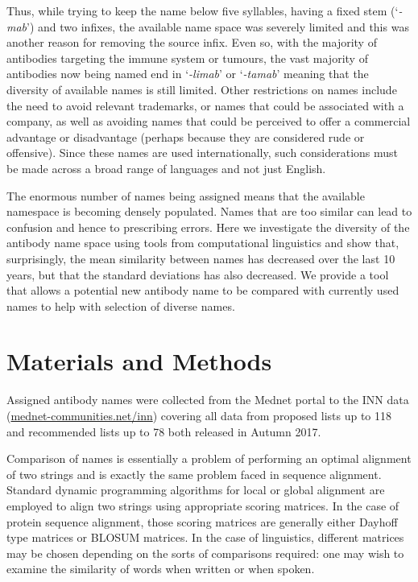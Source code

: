 \documentclass{article}
\newcommand{\eg}[1]{\mbox{`\emph{#1}'}}
\begin{document}
Thus, while trying to keep the name below five syllables, having a
fixed stem (\eg{-mab}) and two infixes, the available name space was
severely limited and this was another reason for removing the source
infix. Even so, with the majority of antibodies targeting the immune
system or tumours, the vast majority of antibodies now being named end
in \eg{-limab} or \eg{-tamab} meaning that the diversity of available
names is still limited. Other restrictions on names include the need
to avoid relevant trademarks, or names that could be associated with a
company, as well as avoiding names that could be perceived to offer a
commercial advantage or disadvantage (perhaps because they are
considered rude or offensive). Since these names are used
internationally, such considerations must be made across a broad range
of languages and not just English.

The enormous number of names being assigned means that the available
namespace is becoming densely populated. Names that are too similar
can lead to confusion and hence to prescribing errors. Here we
investigate the diversity of the antibody name space using tools from
computational linguistics and show that, surprisingly, the mean
similarity between names has decreased over the last 10 years, but
that the standard deviations has also decreased.  We provide a tool
that allows a potential new antibody name to be compared with
currently used names to help with selection of diverse names.

\section{Materials and Methods}
Assigned antibody names were collected from the Mednet portal to the
INN data (\url{mednet-communities.net/inn}) covering all data from
proposed lists up to 118 and recommended lists up to 78 both released
in Autumn 2017.

Comparison of names is essentially a problem of performing an optimal
alignment of two strings and is exactly the same problem faced in
sequence alignment. Standard dynamic programming algorithms for
local\cite{sw:alignment} or global\cite{nw:alignment} alignment are
employed to align two strings using appropriate scoring matrices. In
the case of protein sequence alignment, those scoring matrices are
generally either Dayhoff type matrices\cite{dayhoff:mdm78} or BLOSUM
matrices\cite{henikoff:blosum}. In the case of linguistics, different
matrices may be chosen depending on the sorts of comparisons required:
one may wish to examine the similarity of words when written or when
spoken.
\end{document}
